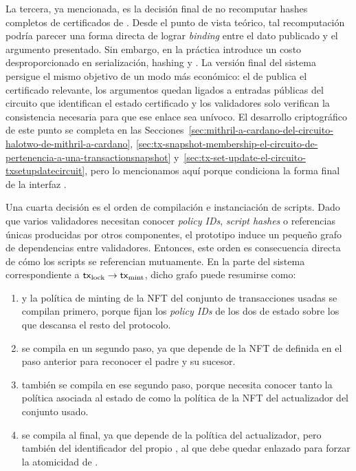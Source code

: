 La tercera, ya mencionada, es la decisión final de no recomputar \Onchain hashes completos de certificados de \Mithril. Desde el punto de vista teórico, tal recomputación podría parecer una forma directa de lograr \textit{binding} entre el dato publicado y el argumento \ZK presentado. Sin embargo, en la práctica introduce un costo desproporcionado en serialización, hashing y \ExUnits. La versión final del sistema persigue el mismo objetivo de un modo más económico: el \UTxO de \StakeDistribution publica el certificado relevante, los argumentos quedan ligados a entradas públicas del circuito que identifican el estado certificado y los validadores solo verifican la consistencia necesaria para que ese enlace sea unívoco. El desarrollo criptográfico de este punto se completa en las Secciones~\ref{sec:mithril-a-cardano-del-circuito-halotwo-de-mithril-a-cardano}, \ref{sec:tx-snapshot-membership-el-circuito-de-pertenencia-a-una-transactionsnapshot} y~\ref{sec:tx-set-update-el-circuito-txsetupdatecircuit}, pero lo mencionamos aquí porque condiciona la forma final de la interfaz \Onchain.

Una cuarta decisión es el orden de compilación e instanciación de scripts. Dado que varios validadores necesitan conocer \textit{policy IDs}, \textit{script hashes} o referencias únicas producidas por otros componentes, el prototipo induce un pequeño grafo de dependencias entre validadores. Entonces, este orden es consecuencia directa de cómo los scripts se referencian mutuamente. En la parte del sistema correspondiente a $\mathsf{tx}_{\mathrm{lock}} \rightarrow \mathsf{tx}_{\mathrm{mint}}$, dicho grafo puede resumirse como:

\begin{enumerate}[noitemsep]
  \item \StakeDistributionMintValidator y la política de minting de la NFT del conjunto de transacciones usadas se compilan primero, porque fijan los \textit{policy IDs} de los dos \UTxOs de estado sobre los que descansa el resto del protocolo.
  \item \StakeDistributionSpendValidator se compila en un segundo paso, ya que depende de la NFT de \StakeDistribution definida en el paso anterior para reconocer el \UTxO padre y su sucesor.
  \item \MintingValidator también se compila en ese segundo paso, porque necesita conocer tanto la política asociada al estado de \StakeDistribution como la política de la NFT del actualizador del conjunto usado.
  \item \TxsUpdaterMintingValidator se compila al final, ya que depende de la política del actualizador, pero también del identificador del propio \MintingValidator, al que debe quedar enlazado para forzar la atomicidad de \MintTx.
\end{enumerate}

